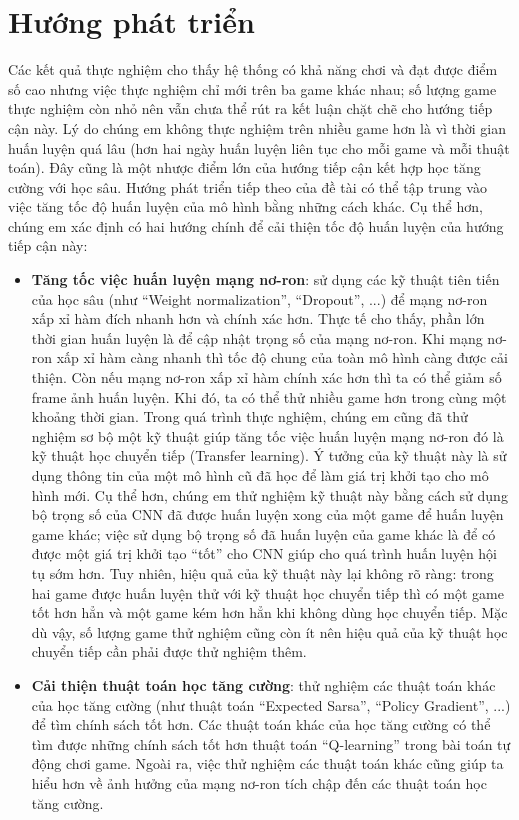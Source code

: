 \section{Hướng phát triển}
	Các kết quả thực nghiệm cho thấy hệ thống có khả năng chơi và đạt được điểm số cao nhưng việc thực nghiệm chỉ mới trên ba game khác nhau; số lượng game thực nghiệm còn nhỏ nên vẫn chưa thể rút ra kết luận chặt chẽ cho hướng tiếp cận này.
	Lý do chúng em không thực nghiệm trên nhiều game hơn là vì thời gian huấn luyện quá lâu (hơn hai ngày huấn luyện liên tục cho mỗi game và mỗi thuật toán).
	Đây cũng là một nhược điểm lớn của hướng tiếp cận kết hợp học tăng cường với học sâu.
	Hướng phát triển tiếp theo của đề tài có thể tập trung vào việc tăng tốc độ huấn luyện của mô hình bằng những cách khác.
	Cụ thể hơn, chúng em xác định có hai hướng chính để cải thiện tốc độ huấn luyện của hướng tiếp cận này:
	\begin{itemize}
		\item \textbf{Tăng tốc việc huấn luyện mạng nơ-ron}: sử dụng các kỹ thuật tiên tiến của học sâu (như ``Weight normalization'', ``Dropout'', ...) để mạng nơ-ron xấp xỉ hàm đích nhanh hơn và chính xác hơn.
		Thực tế cho thấy, phần lớn thời gian huấn luyện là để cập nhật trọng số của mạng nơ-ron. 
		Khi mạng nơ-ron xấp xỉ hàm càng nhanh thì tốc độ chung của toàn mô hình càng được cải thiện.
		Còn nếu mạng nơ-ron xấp xỉ hàm chính xác hơn thì ta có thể giảm số frame ảnh huấn luyện.
		Khi đó, ta có thể thử nhiều game hơn trong cùng một khoảng thời gian.
		Trong quá trình thực nghiệm, chúng em cũng đã thử nghiệm sơ bộ một kỹ thuật giúp tăng tốc việc huấn luyện mạng nơ-ron đó là kỹ thuật học chuyển tiếp (Transfer learning).
		Ý tưởng của kỹ thuật này là sử dụng thông tin của một mô hình cũ đã học để làm giá trị khởi tạo cho mô hình mới.
		Cụ thể hơn, chúng em thử nghiệm kỹ thuật này bằng cách sử dụng bộ trọng số của CNN đã được huấn luyện xong của một game để huấn luyện game khác; việc sử dụng bộ trọng số đã huấn luyện của game khác là để có được một giá trị khởi tạo ``tốt'' cho CNN giúp cho quá trình huấn luyện hội tụ sớm hơn.
		Tuy nhiên, hiệu quả của kỹ thuật này lại không rõ ràng: trong hai game được huấn luyện thử với kỹ thuật học chuyển tiếp thì có một game tốt hơn hẳn và một game kém hơn hẳn khi không dùng học chuyển tiếp.
		Mặc dù vậy, số lượng game thử nghiệm cũng còn ít nên hiệu quả của kỹ thuật học chuyển tiếp cần phải được thử nghiệm thêm.
		\item \textbf{Cải thiện thuật toán học tăng cường}: thử nghiệm các thuật toán khác của học tăng cường (như thuật toán ``Expected Sarsa'', ``Policy Gradient'', ...) để tìm chính sách tốt hơn.
		Các thuật toán khác của học tăng cường có thể tìm được những chính sách tốt hơn thuật toán ``Q-learning'' trong bài toán tự động chơi game.
		Ngoài ra, việc thử nghiệm các thuật toán khác cũng giúp ta hiểu hơn về ảnh hưởng của mạng nơ-ron tích chập đến các thuật toán học tăng cường.
	\end{itemize}
	